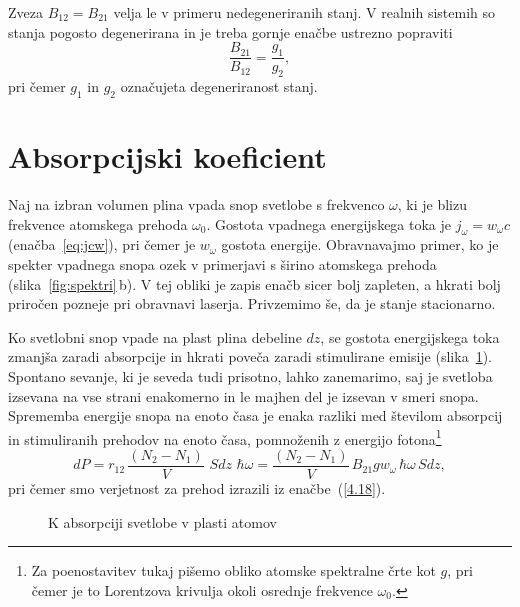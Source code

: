 \begin{remark}
 Zveza $B_{12}=B_{21}$ velja le v primeru nedegeneriranih stanj. V realnih sistemih
 so stanja pogosto degenerirana in je treba gornje enačbe ustrezno popraviti
\begin{equation}
\frac{B_{21}}{B_{12}} = \frac{g_1}{g_2},
\label{eq:ABdeg}
\end{equation}
pri čemer $g_{1}$ in $g_2$ označujeta degeneriranost stanj. 
\end{remark}

\section{Absorpcijski koeficient}
Naj na izbran volumen plina vpada snop svetlobe s frekvenco
$\omega$, ki je blizu frekvence atomskega prehoda $\omega_{0}$. Gostota
vpadnega energijskega toka je $j_{\omega}=w_{\omega}c$ (enačba~\ref{eq:jcw}), 
pri čemer je $w_{\omega}$ gostota energije. Obravnavajmo primer, ko je 
spekter vpadnega snopa ozek v primerjavi s širino atomskega prehoda
(slika~\ref{fig:spektri}\,b). V tej obliki je zapis enačb sicer bolj zapleten,
a hkrati bolj priročen pozneje pri obravnavi laserja. Privzemimo še, da
je stanje stacionarno. 

Ko svetlobni snop vpade na plast plina debeline $dz$, se gostota
energijskega toka zmanjša zaradi absorpcije in hkrati poveča zaradi 
stimulirane emisije (slika~\ref{fig:abs}). 
Spontano sevanje, ki je seveda tudi prisotno, lahko zanemarimo, saj
je svetloba izsevana na vse strani enakomerno in le majhen del je izsevan v smeri snopa.
Sprememba energije snopa na enoto časa je enaka razliki med 
številom absorpcij in stimuliranih prehodov na enoto časa, pomnoženih z 
energijo fotona\footnote{Za poenostavitev tukaj pišemo obliko atomske spektralne črte kot $g$, 
pri čemer je to Lorentzova krivulja okoli osrednje frekvence $\omega_0$.}
\begin{equation}
dP=r_{12}\,\frac{(N_{2}-N_{1})}{V}\,\,S dz\, \, \hbar\omega = 
\frac{(N_{2}-N_{1})}{V}\,B_{21}g w_{\omega} \, \hbar\omega \,S dz,
\label{4.28}
\end{equation}
pri čemer smo verjetnost za prehod izrazili iz 
enačbe~(\ref{4.18}).
\begin{figure}[h]
\centering
\def\svgwidth{70truemm} 

\caption{K absorpciji svetlobe v plasti atomov}
\label{fig:abs}
\end{figure}

